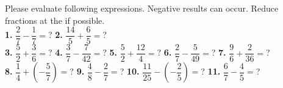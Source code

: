 \documentclass[a4paper]{article}
\begin{document}
\begin{Large}

Please evaluate following expressions. Negative results can occur. Reduce fractions at the if possible.\\[1cm]

\textbf{1.} $\dfrac{2}{7} - \dfrac{1}{7} =$? \hspace{0.2cm}
\textbf{2.} $\dfrac{14}{5} + \dfrac{6}{5} =$? \\[1cm]
		
\textbf{3.} $\dfrac{5}{2} + \dfrac{3}{6} =$? \hspace{0.2cm}
\textbf{4.} $\dfrac{3}{7} - \dfrac{7}{42} =$? \hspace{0.2cm}
\textbf{5.} $\dfrac{5}{2} + \dfrac{12}{4} =$? \hspace{0.2cm}
\textbf{6.} $\dfrac{2}{7} - \dfrac{5}{49} =$? \hspace{0.2cm}
\textbf{7.} $\dfrac{9}{6} + \dfrac{2}{36} =$? \\[1cm]

\textbf{8.} $\dfrac{1}{4} + (-\dfrac{5}{7}) =$? \hspace{0.2cm}
\textbf{9.} $\dfrac{4}{8} - \dfrac{2}{7} =$? \hspace{0.2cm}
\textbf{10.} $\dfrac{11}{25} - (- \dfrac{2}{5}) =$? \hspace{0.2cm}
\textbf{11.} $\dfrac{6}{7} - \dfrac{4}{5} =$?

\end{Large}
\end{document}
